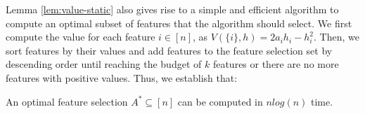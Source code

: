 Lemma \ref{lem:value-static} also gives rise to a simple and efficient algorithm to compute an optimal subset of features that the algorithm should select. We first compute the value for each feature $i \in [n]$, as $V(\{i\},h) = 2 a_i  h_i - h_i^2$. Then, we sort features by %
their values and add features to the feature selection set by descending order until reaching the budget of $k$ features or there are no more features with positive values. Thus, we establish that:

\begin{proposition} \label{thm:complexity-static}
An optimal feature selection  $A^* \subseteq [n]$ can be computed in  $n log(n)$ time.
\end{proposition}




